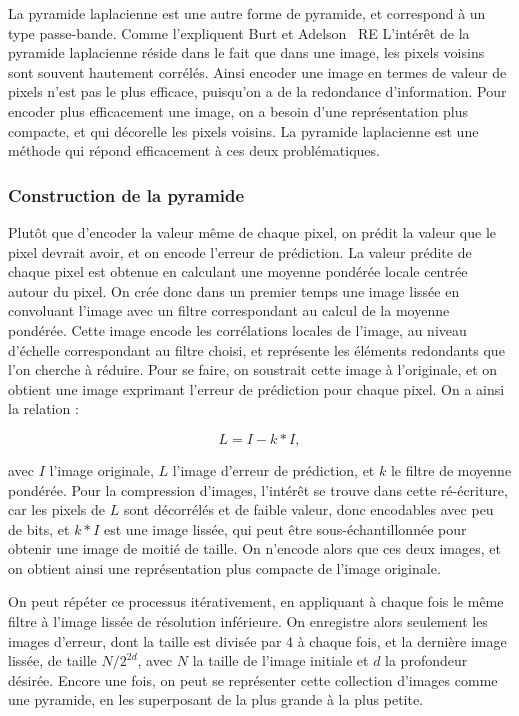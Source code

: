 La pyramide laplacienne est une autre forme de pyramide, et correspond à un type passe-bande. Comme l'expliquent Burt et Adelson~\cite{burt_laplacian_1983} RE L'intérêt de la pyramide laplacienne réside dans le fait que dans une image, les pixels voisins sont souvent hautement corrélés. Ainsi encoder une image en termes de valeur de pixels n'est pas le plus efficace, puisqu'on a de la redondance d'information. Pour encoder plus efficacement une image, on a besoin d'une représentation plus compacte, et qui décorelle les pixels voisins. La pyramide laplacienne est une méthode qui répond efficacement à ces deux problématiques.

\subsubsection{Construction de la pyramide}

Plutôt que d'encoder la valeur même de chaque pixel, on prédit la valeur que le pixel devrait avoir, et on encode l'erreur de prédiction. La valeur prédite de chaque pixel est obtenue en calculant une moyenne pondérée locale centrée autour du pixel. On crée donc dans un premier temps une image lissée en convoluant l'image avec un filtre correspondant au calcul de la moyenne pondérée. Cette image encode les corrélations locales de l'image, au niveau d'échelle correspondant au filtre choisi, et représente les éléments redondants que l'on cherche à réduire. Pour se faire, on soustrait cette image à l'originale, et on obtient une image exprimant l'erreur de prédiction pour chaque pixel. On a ainsi la relation :

\begin{equation}
    L = I - k * I,
\end{equation}

avec $I$ l'image originale, $L$ l'image d'erreur de prédiction, et $k$ le filtre de moyenne pondérée. Pour la compression d'images, l'intérêt se trouve dans cette ré-écriture, car les pixels de $L$ sont décorrélés et de faible valeur, donc encodables avec peu de bits, et $k*I$ est une image lissée, qui peut être sous-échantillonnée pour obtenir une image de moitié de taille. On n'encode alors que ces deux images, et on obtient ainsi une représentation plus compacte de l'image originale.

On peut répéter ce processus itérativement, en appliquant à chaque fois le même filtre à l'image lissée de résolution inférieure. On enregistre alors seulement les images d'erreur, dont la taille est divisée par 4 à chaque fois, et la dernière image lissée, de taille $N/2^{2d}$, avec $N$ la taille de l'image initiale et $d$ la profondeur désirée. Encore une fois, on peut se représenter cette collection d'images comme une pyramide, en les superposant de la plus grande à la plus petite.

